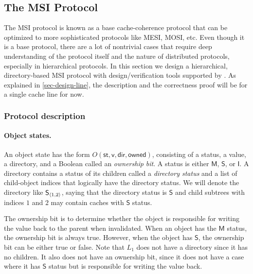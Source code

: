 \documentclass[sigplan,10pt,review,anonymous,screen]{acmart}\settopmatter{printfolios=true,printccs=false,printacmref=false}
\begin{document}
\subsection{The MSI Protocol}
\label{sec-msi-protocol}

\newcommand{\mesi}{\ensuremath{\textsf{MESI}}}
\newcommand{\msi}{\ensuremath{\textsf{MSI}}}
\newcommand{\stM}{\ensuremath{\textsf{M}}}
\newcommand{\stE}{\ensuremath{\textsf{E}}}
\newcommand{\stS}{\ensuremath{\textsf{S}}}
\newcommand{\stI}{\ensuremath{\textsf{I}}}
\newcommand{\dir}[2]{\ensuremath{#1_{\tuple{#2}}}}

The MSI protocol is known as a base cache-coherence protocol that can be optimized to more sophisticated protocols like MESI, MOSI, etc.
Even though it is a base protocol, there are a lot of nontrivial cases that require deep understanding of the protocol itself and the nature of distributed protocols, especially in hierarchical protocols.
In this section we design a hierarchical, directory-based MSI protocol with design/verification tools supported by \hemiola{}.
As explained in \autoref{sec-design-line}, the description and the correctness proof will be for a single cache line for now.

\subsubsection{Protocol description}

\paragraph{Object states.}
An object state has the form $O(\textsf{st}, \textsf{v}, \textsf{dir}, \textsf{owned})$, consisting of a status, a value, a directory, and a Boolean called an \emph{ownership bit}.
A status is either \stM{}, \stS{}, or \stI{}.
A directory contains a status of its children called a \emph{directory status} and a list of child-object indices that logically have the directory status.
We will denote the directory like $\dir{\stS{}}{1, 2}$, saying that the directory status is \stS{} and child subtrees with indices $1$ and $2$ may contain caches with \stS{} status.

The ownership bit is to determine whether the object is responsible for writing the value back to the parent when invalidated.
When an object has the \stM{} status, the ownership bit is always true.
However, when the object has \stS{}, the ownership bit can be either true or false.
Note that $L_1$ does not have a directory since it has no children.
It also does not have an ownership bit, since it does not have a case where it has \stS{} status but is responsible for writing the value back.
\end{document}
